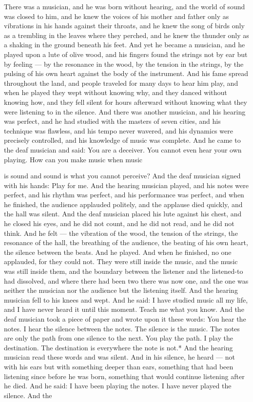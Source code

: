 \documentclass[12pt,openany]{book}
\begin{document}
There was a musician, and he was born without hearing, and the world of sound was closed to him, and he knew the voices of his mother and father only as vibrations in his hands against their throats, and he knew the song of birds only as a trembling in the leaves where they perched, and he knew the thunder only as a shaking in the ground beneath his feet. And yet he became a musician, and he played upon a lute of olive wood, and his fingers found the strings not by ear but by feeling --- by the resonance in the wood, by the tension in the strings, by the pulsing of his own heart against the body of the instrument. And his fame spread throughout the land, and people traveled for many days to hear him play, and when he played they wept without knowing why, and they danced without knowing how, and they fell silent for hours afterward without knowing what they were listening to in the silence. And there was another musician, and his hearing was perfect, and he had studied with the masters of seven cities, and his technique was flawless, and his tempo never wavered, and his dynamics were precisely controlled, and his knowledge of music was complete. And he came to the deaf musician and said: You are a deceiver. You cannot even hear your own playing. How can you make music when music


is sound and sound is what you cannot perceive? And the deaf musician signed with his hands: Play for me. And the hearing musician played, and his notes were perfect, and his rhythm was perfect, and his performance was perfect, and when he finished, the audience applauded politely, and the applause died quickly, and the hall was silent. And the deaf musician placed his lute against his chest, and he closed his eyes, and he did not count, and he did not read, and he did not think. And he felt --- the vibration of the wood, the tension of the strings, the resonance of the hall, the breathing of the audience, the beating of his own heart, the silence between the beats. And he played. And when he finished, no one applauded, for they could not. They were still inside the music, and the music was still inside them, and the boundary between the listener and the listened-to had dissolved, and where there had been two there was now one, and the one was neither the musician nor the audience but the listening itself. And the hearing musician fell to his knees and wept. And he said: I have studied music all my life, and I have never heard it until this moment. Teach me what you know. And the deaf musician took a piece of paper and wrote upon it these words: You hear the notes. I hear the silence between the notes. The silence is the music. The notes are only the path from one silence to the next. You play the path. I play the destination. The destination is everywhere the note is not.* And the hearing musician read these words and was silent. And in his silence, he heard --- not with his ears but with something deeper than ears, something that had been listening since before he was born, something that would continue listening after he died. And he said: I have been playing the notes. I have never played the silence. And the
\end{document}
